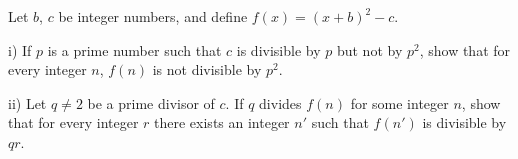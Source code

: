 Let $b$,  $c$ be integer numbers, and define $f(x)=(x+b)^2-c$.

i) If $p$ is a prime number such that $c$ is divisible by $p$ but not by $p^{2}$,  show that for every integer $n$,  $f(n)$ is not divisible by $p^{2}$.

ii) Let $q \neq 2$ be a  prime divisor of $c$. If $q$ divides $f(n)$ for some integer $n$,  show that for every integer $r$ there exists an integer $n'$ such that $f(n')$ is divisible by $qr$.